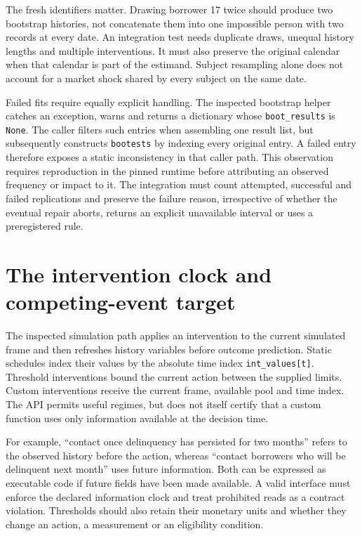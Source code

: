 The fresh identifiers matter. Drawing borrower 17 twice should produce two
bootstrap histories, not concatenate them into one impossible person with two
records at every date. An integration test needs duplicate draws, unequal
history lengths and multiple interventions. It must also preserve the original
calendar when that calendar is part of the estimand. Subject resampling alone
does not account for a market shock shared by every subject on the same date.

Failed fits require equally explicit handling. The inspected bootstrap helper
catches an exception, warns and returns a dictionary whose
\texttt{boot\_results} is \texttt{None}. The caller filters such entries when
assembling one result list, but subsequently constructs \texttt{bootests} by
indexing every original entry. A failed entry therefore exposes a static
inconsistency in that caller path. This observation requires reproduction in
the pinned runtime before attributing an observed frequency or impact to it.
The integration must count attempted, successful and failed replications and
preserve the failure reason, irrespective of whether the eventual repair
aborts, returns an explicit unavailable interval or uses a preregistered rule.
\cite{v13_sw_pygformula,v131_sw_pygformula}

\section{The intervention clock and competing-event target}

The inspected simulation path applies an intervention to the current simulated
frame and then refreshes history variables before outcome prediction. Static
schedules index their values by the absolute time index \texttt{int\_values[t]}.
Threshold interventions bound the current action between the supplied limits.
Custom interventions receive the current frame, available pool and time index.
The API permits useful regimes, but does not itself certify that a custom
function uses only information available at the decision time.
\cite{v131_sw_pygformula}

For example, ``contact once delinquency has persisted for two months'' refers
to the observed history before the action, whereas ``contact borrowers who
will be delinquent next month'' uses future information. Both can be expressed
as executable code if future fields have been made available. A valid interface
must enforce the declared information clock and treat prohibited reads as a
contract violation. Thresholds should also retain their monetary units and
whether they change an action, a measurement or an eligibility condition.

